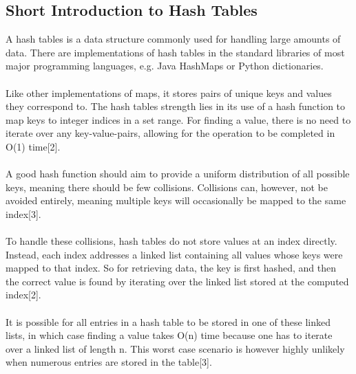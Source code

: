 \subsection{Short Introduction to Hash Tables}
A hash tables is a data structure commonly used for handling large amounts of data.
There are implementations of hash tables in the standard libraries of most major programming languages, e.g. Java HashMaps or Python dictionaries.\\\\
Like other implementations of maps, it stores pairs of unique keys and values they correspond to. The hash tables strength lies in its use of a hash function to map keys to integer indices in a set range. For finding a value, there is no need to iterate over any key-value-pairs, allowing for the operation to be completed in O(1) time[2].\\\\
A good hash function should aim to provide a uniform distribution of all possible keys, meaning there should be few collisions. Collisions can, however, not be avoided entirely, meaning multiple keys will occasionally be mapped to the same index[3].\\\\
To handle these collisions, hash tables do not store values at an index directly. Instead, each index addresses a linked list containing all values whose keys were mapped to that index.
So for retrieving data, the key is first hashed, and then the correct value is found by iterating over the linked list stored at the computed index[2].\\\\
It is possible for all entries in a hash table to be stored in one of these linked lists, in which case finding a value takes O(n) time because one has to iterate over a linked list of length n. This worst case scenario is however highly unlikely when numerous entries are stored in the table[3].
